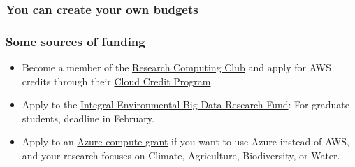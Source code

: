 \documentclass{beamer}
\begin{document}
	\begin{frame}
	\frametitle{You can create your own budgets}
	\end{frame}

	\begin{frame}
	\frametitle{Some sources of funding}
	\begin{itemize}
		\item Become a member of the \href{https://depts.washington.edu/uwrcc/}{Research Computing Club} and apply for AWS credits through their \href{https://depts.washington.edu/uwrcc/getting-started-2/cloud-computing/}{Cloud Credit Program}.

		\vspace{0.5cm}

		\item Apply to the \href{https://environment.uw.edu/students/student-resources/scholarships-funding/graduate-scholarships-funding/other-graduate-funding-opportunities/integral-environmental-big-data-research-award/}{Integral Environmental Big Data Research Fund}: For graduate students, deadline in February.

		\vspace{0.5cm}

		\item Apply to an \href{https://www.microsoft.com/en-us/ai/ai-for-earth-grants}{Azure compute grant} if you want to use Azure instead of AWS, and your research focuses on Climate, Agriculture, Biodiversity, or Water.
	\end{itemize}
	\end{frame}
\end{document}
